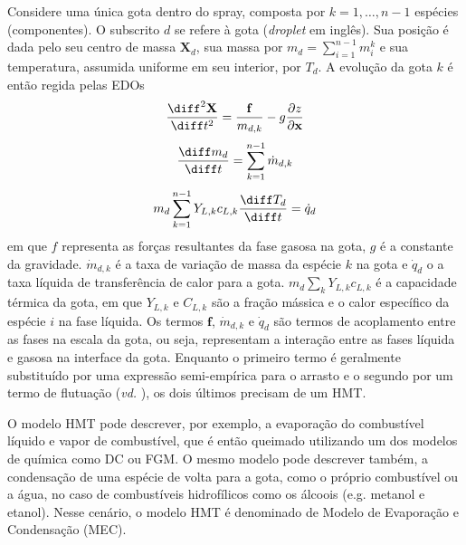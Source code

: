 Considere uma única gota dentro do spray, composta por $k=1,\ldots,n-1$ espécies (componentes).
O subscrito $d$ se refere à gota (\emph{droplet} em inglês).
Sua posição é dada pelo seu centro de massa $\mathbf X_d$, sua massa por $m_d = \sum_{i=1}^{n-1} m_{i}^k$ e sua temperatura, assumida uniforme em seu interior, por $T_d$.
A evolução da gota $k$ é então regida pelas EDOs \cite{JennyB2012}
\begin{equation}
    \frac{\diff^2 \mathbf X}{\diff t^2} =
    \frac{\mathbf f}{ m_{d,k}} -
    g \frac{\partial z}{\partial \mathbf x}
    \label{eq:Xd}
\end{equation}
\begin{equation}
    \frac{\diff m_{d}}{\diff t} = \sum_{k=1}^{n-1} \dot m_{d,k}
    \label{eq:md}
\end{equation}
\begin{equation}
    m_d \sum_{k=1}^{n-1} Y_{L,k} c_{L,k} \frac{\diff T_d}{\diff t} = \dot q_d
    \label{eq:Td}
\end{equation}
em que $f$ representa as forças resultantes da fase gasosa na gota, $g$ é a constante da gravidade.
$\dot m_{d,k}$ é a taxa de variação de massa da espécie $k$ na gota e $\dot q_d$ o a taxa líquida de transferência de calor para a gota.
$ m_d \sum_k Y_{L,k} c_{L,k}$ é a capacidade térmica da gota, em que 
$Y_{L,k}$ e $C_{L,k}$ são a fração mássica e o calor específico da  espécie $i$ na fase líquida.
Os termos $\mathbf f$, $\dot m_{d,k}$ e $\dot q_d$ são termos de acoplamento entre as fases na escala da gota, ou seja, representam a interação entre as fases líquida e gasosa na interface da gota.
Enquanto o primeiro termo é geralmente substituído por uma expressão semi-empírica para o arrasto e o segundo por um termo de flutuação (\emph{vd.} \cite[p. 16]{JennyB2012}), os dois últimos precisam de um HMT. 

O modelo HMT pode descrever, por exemplo, a evaporação do combustível líquido e vapor de combustível, que é então queimado utilizando um dos modelos de química como DC ou FGM.
O mesmo modelo pode descrever também, a condensação de uma espécie de volta para a gota, como o próprio combustível ou a água, no caso de combustíveis hidrofílicos como os álcoois (e.g. metanol e etanol).
Nesse cenário, o modelo HMT é denominado de Modelo de Evaporação e Condensação (MEC).

